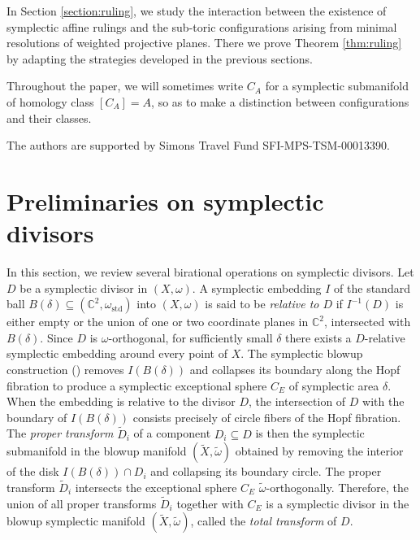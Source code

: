 \documentclass[11pt]{article}
\theoremstyle{definition}
\theoremstyle{remark}
\newcommand{\C}{\mathbb{C}}
\begin{document}
\medskip
\noindent In Section \ref{section:ruling}, we study the interaction between the existence of symplectic affine rulings and the sub-toric configurations arising from minimal resolutions of weighted projective planes. There we prove Theorem \ref{thm:ruling} by adapting the strategies developed in the previous sections.

\medskip
\noindent Throughout the paper, we will sometimes write $C_A$ for a symplectic submanifold of homology class $[C_A]=A$, so as to make a distinction between configurations and their classes.

\medskip
{}  The authors  are supported by Simons Travel Fund SFI-MPS-TSM-00013390.

\section{Preliminaries on symplectic divisors}\label{section:divisorintro}

In this section, we review several birational operations on symplectic divisors. Let $D$ be a symplectic divisor in $(X,\omega)$.
 A symplectic embedding $I$ of the standard ball $B(\delta)\subseteq (\C^2,\omega_{\mathrm{std}})$ into $(X,\omega)$ is said to be \emph{relative to $D$} if $I^{-1}(D)$ is either empty or the union of one or two coordinate planes in $\C^2$, intersected with $B(\delta)$. Since $D$ is $\omega$-orthogonal, for sufficiently small $\delta$ there exists a $D$-relative symplectic embedding around every point of $X$. The symplectic blowup construction (\cite[Section 7.1]{MSbook}) removes $I(B(\delta))$ and collapses its boundary along the Hopf fibration to produce a symplectic exceptional sphere $C_E$ of symplectic area $\delta$. When the embedding is relative to the divisor $D$, the intersection of $D$ with the boundary of $I(B(\delta))$ consists precisely of circle fibers of the Hopf fibration. The \emph{proper transform} $\tilde{D}_i$ of a component $D_i\subseteq D$ is then the symplectic submanifold in the blowup manifold $(\tilde{X},\tilde{\omega})$ obtained by removing the interior of the disk $I(B(\delta))\cap D_i$ and collapsing its boundary circle. The proper transform $\tilde{D}_i$ intersects the exceptional sphere $C_E$ $\tilde{\omega}$-orthogonally. Therefore, the union of all proper transforms $\tilde{D}_i$ together with $C_E$ is a symplectic divisor in the blowup symplectic manifold $(\tilde{X},\tilde{\omega})$, called the \emph{total transform} of $D$.
\end{document}
